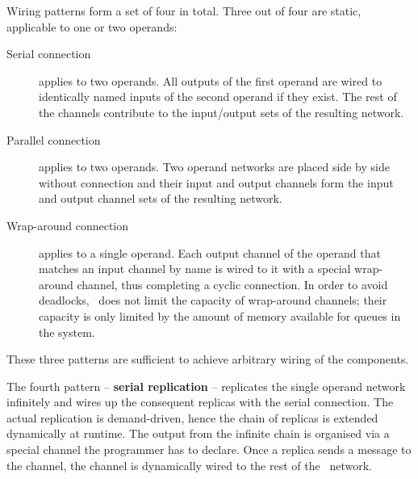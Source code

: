 Wiring patterns form a set of four in total. Three out of four are static, applicable to one or two operands:
\begin{description}
\item[Serial connection] applies to two operands. All outputs of the first operand are wired to identically named inputs of the second operand if they exist. The rest of the channels contribute to the input/output sets of the resulting network.

\item[Parallel connection] applies to two operands. Two operand networks are placed side by side without connection and their input and output channels form the input and output channel sets of the resulting network.

\item[Wrap-around connection] applies to a single operand. Each output channel of the operand that matches an input channel by name is wired to it with a special wrap-around channel, thus completing a cyclic connection. In order to avoid deadlocks, \ak\ does not limit the capacity of wrap-around channels; their capacity is only limited by the amount of memory available for queues in the system.
\end{description}
These three patterns are sufficient to achieve arbitrary wiring of the components.

The fourth pattern -- \textbf{serial replication} -- replicates the single operand network infinitely and wires up the consequent replicas with the serial connection. The actual replication is demand-driven, hence the chain of replicas is extended dynamically at runtime. The output from the infinite chain is organised via a special channel the programmer has to declare. Once a replica sends a message to the channel, the channel is dynamically wired to the rest of the \ak\ network.



